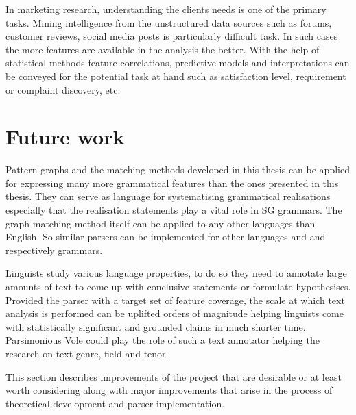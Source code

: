     In marketing research, understanding the clients needs is one of the primary tasks. Mining intelligence from the unstructured data sources such as forums, customer reviews, social media posts is particularly difficult task. In such cases the more features are available in the analysis the better. With the help of  statistical methods feature correlations, predictive models and interpretations can be conveyed for the potential task at hand such as satisfaction level, requirement or complaint discovery, etc.

\section{Future work}
\label{sec:future-work}

    Pattern graphs and the matching methods developed in this thesis can be applied for expressing many more grammatical features than the ones presented in this thesis. They can serve as language for systematising grammatical realisations especially that the realisation statements play a vital role in SG grammars. The graph matching method itself can be applied to any other languages than English. So similar parsers can be implemented for other languages and and respectively grammars. 

    Linguists study various language properties, to do so they need to annotate large amounts of text to come up with conclusive statements or formulate hypothesises. Provided the parser with a target set of feature coverage, the scale at which text analysis is performed can be uplifted orders of magnitude helping linguists come with statistically significant and grounded claims in much shorter time. Parsimonious Vole could play the role of such a text annotator helping the research on text genre, field and tenor.


    This section describes improvements of the project that are desirable or at least worth considering along with major improvements that arise in the process of theoretical development and parser implementation. 


